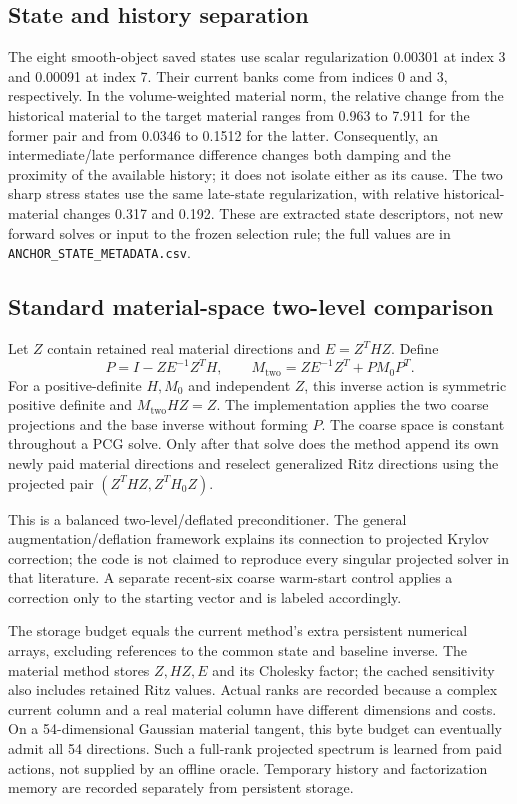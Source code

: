 \subsection*{State and history separation}
The eight smooth-object saved states use scalar regularization 0.00301 at index 3 and 0.00091 at index 7. Their current banks come from indices 0 and 3, respectively. In the volume-weighted material norm, the relative change from the historical material to the target material ranges from 0.963 to 7.911 for the former pair and from 0.0346 to 0.1512 for the latter. Consequently, an intermediate/late performance difference changes both damping and the proximity of the available history; it does not isolate either as its cause. The two sharp stress states use the same late-state regularization, with relative historical-material changes 0.317 and 0.192. These are extracted state descriptors, not new forward solves or input to the frozen selection rule; the full values are in \texttt{ANCHOR\_STATE\_METADATA.csv}.

\subsection*{Standard material-space two-level comparison}
Let $Z$ contain retained real material directions and $E=Z^THZ$. Define
\[
P=I-ZE^{-1}Z^TH,\qquad
M_{\mathrm{two}}=ZE^{-1}Z^T+PM_0P^T.
\]
For a positive-definite $H,M_0$ and independent $Z$, this inverse action is symmetric positive definite and $M_{\mathrm{two}}HZ=Z$. The implementation applies the two coarse projections and the base inverse without forming $P$. The coarse space is constant throughout a PCG solve. Only after that solve does the method append its own newly paid material directions and reselect generalized Ritz directions using the projected pair $(Z^THZ,Z^TH_0Z)$.

This is a balanced two-level/deflated preconditioner. The general augmentation/deflation framework explains its connection to projected Krylov correction; the code is not claimed to reproduce every singular projected solver in that literature. A separate recent-six coarse warm-start control applies a correction only to the starting vector and is labeled accordingly.

The storage budget equals the current method's extra persistent numerical arrays, excluding references to the common state and baseline inverse. The material method stores $Z,HZ,E$ and its Cholesky factor; the cached sensitivity also includes retained Ritz values. Actual ranks are recorded because a complex current column and a real material column have different dimensions and costs. On a 54-dimensional Gaussian material tangent, this byte budget can eventually admit all 54 directions. Such a full-rank projected spectrum is learned from paid actions, not supplied by an offline oracle. Temporary history and factorization memory are recorded separately from persistent storage.

